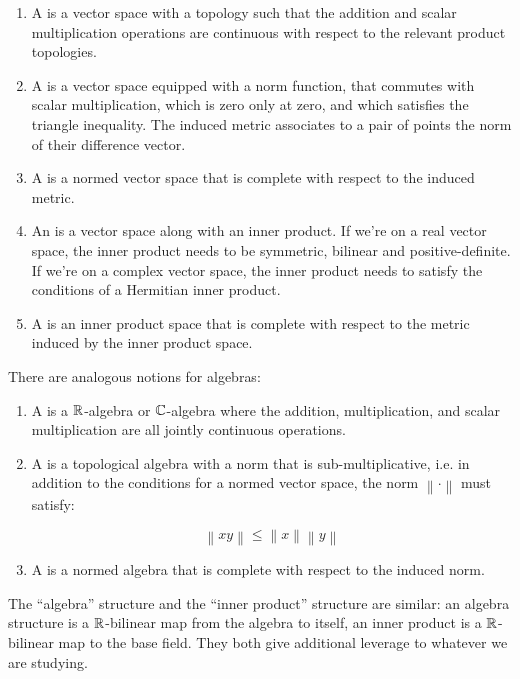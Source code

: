 \documentclass[a4paper]{amsart}
\newcommand{\norm}[1]{\left\|#1\right\|}
\begin{document}
\begin{definer}

\begin{enumerate}

\item A  is a vector space with a
  topology such that the addition and scalar multiplication operations
  are continuous with respect to the relevant product topologies.

\item A  is a vector space equipped
  with a norm function, that commutes with scalar multiplication,
  which is zero only at zero, and which satisfies the triangle
  inequality. The induced metric associates to a pair of points the
  norm of their difference vector.

\item A  is a normed vector space that is
  complete with respect to the induced metric.

\item An  is a vector space along with
  an inner product. If we're on a real vector space, the inner product
  needs to be symmetric, bilinear and positive-definite. If we're on a
  complex vector space, the inner product needs to satisfy the
  conditions of a Hermitian inner product.

\item A  is an inner product space that is
  complete with respect to the metric induced by the inner product
  space.

\end{enumerate}

\end{definer}
There are analogous notions for algebras:

\begin{definer}
\begin{enumerate}

\item A  is a $\mathbb{R}$-algebra or
  $\mathbb{C}$-algebra where the addition, multiplication, and scalar
  multiplication are all jointly continuous operations.

\item A  is a topological algebra with a
  norm that is sub-multiplicative, i.e. in addition to the conditions
  for a normed vector space, the norm $\norm{\cdot}$ must satisfy:

  $$\norm{xy} \le \norm{x} \norm{y}$$

\item A  is a normed algebra that is
  complete with respect to the induced norm.

\end{enumerate}
\end{definer}
The ``algebra'' structure and the ``inner product'' structure are
similar: an algebra structure is a $\mathbb{R}$-bilinear map from the algebra
to itself, an inner product is a $\mathbb{R}$-bilinear map to the base
field. They both give additional leverage to whatever we are studying.
\end{document}
